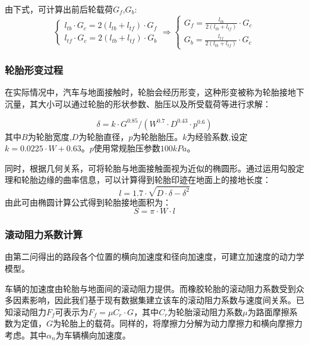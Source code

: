 \documentclass[withoutpreface,bwprint]{cumcmthesis} %
\begin{document}
由下式，可计算出前后轮载荷$G_f$,$G_b$:
\begin{equation}
\label{lodingVocant}
\left\{
\begin{aligned}
l_{tb} \cdot G_c=2(l_{tb}+l_{tf}) \cdot G_f \\
l_{tf} \cdot G_c=2(l_{tb}+l_{tf}) \cdot G_b 
\end{aligned}
\right.
\Longrightarrow
\left\{
\begin{aligned}
    G_f=\frac{l_{tb}}{2(l_{tb}+l_{tf})} \cdot G_c \\
    G_b=\frac{l_{tf}}{2(l_{tb}+l_{tf})} \cdot G_c
\end{aligned}
\right.
\end{equation}

\subsubsection{轮胎形变过程}

在实际情况中，汽车与地面接触时，轮胎会经历形变，这种形变被称为轮胎接地下沉量，其大小可以通过轮胎的形状参数、胎压以及所受载荷等进行求解：

\begin{equation}
    \delta=k \cdot G^{0.85} / (W^{0.7} \cdot D^{0.43} \cdot p^{0.6})
\end{equation}
其中$B$为轮胎宽度,$D$为轮胎直径，$p$为轮胎胎压。$k$为经验系数,设定$k=0.0225\cdot W + 0.63$。$p$使用常规胎压参数$100kPa$。

同时，根据几何关系，可将轮胎与地面接触面视为近似的椭圆形。通过运用勾股定理和轮胎边缘的曲率信息，可以计算得到轮胎印迹在地面上的接地长度：
\begin{equation}
    l=1.7 \cdot \sqrt{D \cdot \delta -\delta^2}
\end{equation}
由此可由椭圆计算公式得到轮胎接地面积为：
\begin{equation}
    S=\pi \cdot W \cdot l
\end{equation}

\subsubsection{滚动阻力系数计算}



由第二问得出的路段各个位置的横向加速度和径向加速度，可建立加速度的动力学模型。

车辆的加速度由轮胎与地面间的滚动阻力提供。而橡胶轮胎的滚动阻力系数受到众多因素影响，因此我们基于现有数据集建立该车的滚动阻力系数与速度间关系。已知滚动阻力$F_f$可表示为$F_f=\mu C_r \cdot G$，其中$C_r$为轮胎滚动阻力系数$\mu$为路面摩擦系数为定值，$G$为轮胎上的载荷。同样的，将摩擦力分解为动力摩擦力和横向摩擦力考虑。其中$\alpha_n $为车辆横向加速度。
\end{document}
